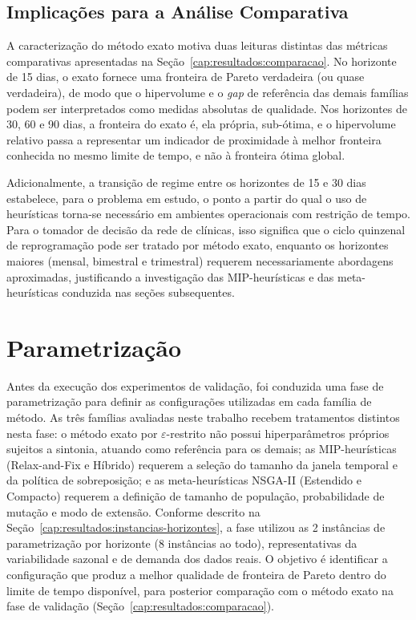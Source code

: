 \subsection{Implicações para a Análise Comparativa}
\label{cap:resultados:exato-implicacoes}

A caracterização do método exato motiva duas leituras distintas das métricas comparativas apresentadas na Seção~\ref{cap:resultados:comparacao}. No horizonte de 15 dias, o exato fornece uma fronteira de Pareto verdadeira (ou quase verdadeira), de modo que o hipervolume e o \textit{gap} de referência das demais famílias podem ser interpretados como medidas absolutas de qualidade. Nos horizontes de 30, 60 e 90 dias, a fronteira do exato é, ela própria, sub-ótima, e o hipervolume relativo passa a representar um indicador de proximidade à melhor fronteira conhecida no mesmo limite de tempo, e não à fronteira ótima global.

Adicionalmente, a transição de regime entre os horizontes de 15 e 30 dias estabelece, para o problema em estudo, o ponto a partir do qual o uso de heurísticas torna-se necessário em ambientes operacionais com restrição de tempo. Para o tomador de decisão da rede de clínicas, isso significa que o ciclo quinzenal de reprogramação pode ser tratado por método exato, enquanto os horizontes maiores (mensal, bimestral e trimestral) requerem necessariamente abordagens aproximadas, justificando a investigação das MIP-heurísticas e das meta-heurísticas conduzida nas seções subsequentes.

\section{Parametrização}
\label{cap:resultados:parametrizacao}

Antes da execução dos experimentos de validação, foi conduzida uma fase de parametrização para definir as configurações utilizadas em cada família de método. As três famílias avaliadas neste trabalho recebem tratamentos distintos nesta fase: o método exato por $\varepsilon$-restrito não possui hiperparâmetros próprios sujeitos a sintonia, atuando como referência para os demais; as MIP-heurísticas (Relax-and-Fix e Híbrido) requerem a seleção do tamanho da janela temporal e da política de sobreposição; e as meta-heurísticas NSGA-II (Estendido e Compacto) requerem a definição de tamanho de população, probabilidade de mutação e modo de extensão. Conforme descrito na Seção~\ref{cap:resultados:instancias-horizontes}, a fase utilizou as 2 instâncias de parametrização por horizonte (8 instâncias ao todo), representativas da variabilidade sazonal e de demanda dos dados reais. O objetivo é identificar a configuração que produz a melhor qualidade de fronteira de Pareto dentro do limite de tempo disponível, para posterior comparação com o método exato na fase de validação (Seção~\ref{cap:resultados:comparacao}).

